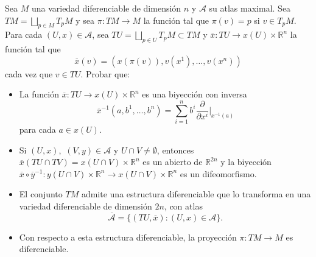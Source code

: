 \documentclass[11pt]{article}
\newcommand{\R}{\mathbb{R}}
\newcommand{\paint}[2]{\color{#1}{#2}}
\newcommand{\ol}{\overline}
\newenvironment{exercise}[2][Ejercicio]{\begin{trivlist}
\item[\hskip \labelsep \paint{red}{{\bfseries #1}}\hskip \labelsep {\bfseries #2.}]}{\end{trivlist}}
\begin{document}
\begin{exercise}{9} Sea $M$ una variedad diferenciable de dimensi\'on $n$ y $\mathcal{A}$ su atlas maximal. Sea $TM=\bigsqcup_{p\in M}T_pM$ y sea $\pi :TM\to M$ la funci\'on tal
que $\pi (v)=p$ si $v\in T_pM$. Para cada $(U,x)\in \mathcal{A}$, sea
$TU=\bigsqcup_{p\in U}T_pM\subset TM$ y $\ol{x}:TU\to
x(U)\times \R^{n}$ la funci\'on tal que
  \[
  \ol{x}(v)=(x(\pi (v)),v(x^{1}),\dots ,v(x^{n}))
  \]
cada vez que $v\in TU$. Probar que:
\begin{itemize}
\item[(a)] La funci\'on $\ol{x}:TU\to x(U)\times \R^{n}$ es una biyecci\'on
con inversa
  \[
  \ol{x}^{-1}(a,b^{1},\dots,b^{n})
        = \sum_{i=1}^{n}b^{i}\frac{\partial}{\partial x^{i}}\Big|_{x^{-1}(a)}
  \]
para cada $a\in x(U).$

\item[(b)] Si $(U,x)$,~$(V,y)\in \mathcal{A}$ y $U\cap V\neq\emptyset$, entonces $\ol{x}(TU\cap
TV) = x(U\cap V)\times\R^{n}$ es un abierto de $\R^{2n}$ y 
la biyecci\'on $\ol{x}\circ \ol{y }^{-1}:y(U\cap V)\times\R^{n}\to x(U\cap V)\times 
\R^{n}$ es un difeomorfismo.

\item[(c)] El conjunto $TM$ admite una estructura diferenciable que lo transforma en
una variedad diferenciable de dimensi\'on $2n$, con atlas
  \[
  \ol{\mathcal{A}}=\{(TU,\ol{x}):(U,x)\in\mathcal{A}\}.
  \]

\item[(d)] Con respecto a esta estructura diferenciable, la proyecci\'on $\pi :TM\to M$ es diferenciable.
\end{itemize}
\end{exercise}
\end{document}
